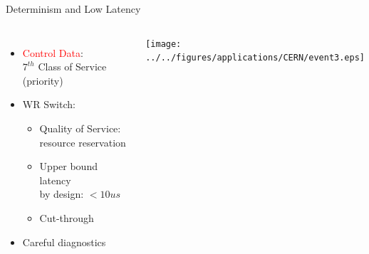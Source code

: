 \documentclass[compress,red]{beamer}
\begin{document}
\begin{frame}{Determinism and Low Latency}

\begin{columns}[c]

      \begin{itemize}
	    \item \textcolor{red}{Control Data}: \\$7^{th}$ Class of Service (priority)
	    \item WR Switch:
	    \begin{itemize}
	      \item Quality of Service: resource reservation
	      \item Upper bound latency \\ by design: $<10us$
	      \item Cut-through
	    \end{itemize}
	    \item Careful diagnostics
      \end{itemize}
% 
    \begin{center}
    \texttt{[image: ../../figures/applications/CERN/event3.eps]}
    \end{center}

\end{columns}

\end{frame}
% 
% 
\end{document}
